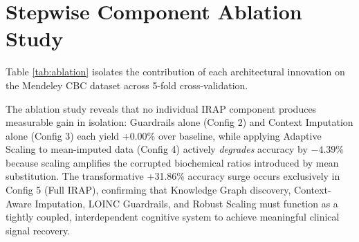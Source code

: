 \documentclass[MTech]{ugthesis}
\begin{document}
\section{Stepwise Component Ablation Study}
Table \ref{tab:ablation} isolates the contribution of each architectural innovation on the Mendeley \ac{CBC} dataset across 5-fold cross-validation.

\begin{table}[htpb]
\small
\centering
\renewcommand{\arraystretch}{1.3}
\caption{Stepwise component ablation study on the Mendeley CBC Hematology cohort.}
\label{tab:ablation}
\end{table}

The ablation study reveals that no individual IRAP component produces measurable gain in isolation: Guardrails alone (Config 2) and Context Imputation alone (Config 3) each yield +0.00\% over baseline, while applying Adaptive Scaling to mean-imputed data (Config 4) actively \emph{degrades} accuracy by \textbf{$-4.39\%$} because scaling amplifies the corrupted biochemical ratios introduced by mean substitution. The transformative +31.86\% accuracy surge occurs exclusively in Config 5 (Full IRAP), confirming that Knowledge Graph discovery, Context-Aware Imputation, LOINC Guardrails, and Robust Scaling must function as a tightly coupled, interdependent cognitive system to achieve meaningful clinical signal recovery.
\end{document}
